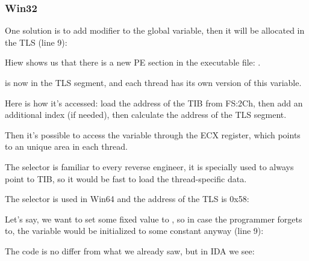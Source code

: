 \subsubsection{Win32}


One solution is to add  modifier to the global variable, 
then it will be allocated in the \ac{TLS} (line 9):



Hiew shows us that there is a new PE section in the executable file: .



 is now in the \ac{TLS} segment, and each thread has its own version of this variable.

Here is how it's accessed: load the address of the \ac{TIB} from FS:2Ch, then add an additional index (if needed),
then calculate the address of the \ac{TLS} segment.

Then it's possible to access the  variable through the ECX register, which points to an unique area in each thread.


The  selector is familiar to every reverse engineer, it is specially used to always point to \ac{TIB},
so it would be fast to load the thread-specific data.


The  selector is used in Win64 and the address of the \ac{TLS} is 0x58:




Let's say, we want to set some fixed value to , so in case the programmer forgets to,
the  variable would be initialized to some constant anyway (line 9):



The code is no differ from what we already saw, but in IDA we see:



